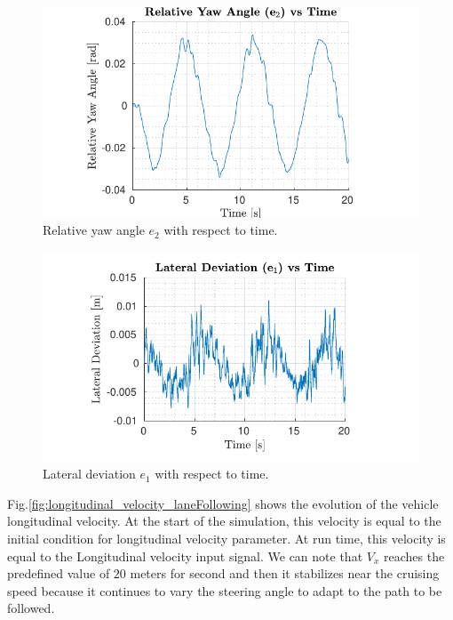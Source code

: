 \documentclass[conference, 11pt]{IEEEtran}
\begin{document}
\begin{figure}[!h]
	\centering
	\hspace*{-0.5in}
	\includegraphics[width=1.29\columnwidth]{../../MATLAB/lane_following/figure/RelativeYawAngleVsTime.pdf}
	\caption{Relative yaw angle $e_2$ with respect to time.}
	\label{fig:relative_yaw_angle_laneFollowing}
\end{figure}
\begin{figure}[!h]
	\centering
	\hspace*{-0.5in}
	\includegraphics[width=1.29\columnwidth]{../../MATLAB/lane_following/figure/LateralDeviationVsTime.pdf}
	\caption{Lateral deviation $e_1$ with respect to time.}
	\label{fig:lateral_deviation_laneFollowing}
\end{figure}
Fig.{\ref{fig:longitudinal_velocity_laneFollowing}} shows the evolution of the vehicle longitudinal velocity. At the start of the simulation, this velocity is equal to the initial condition for longitudinal velocity parameter. At run time, this velocity is equal to the Longitudinal velocity input signal. We can note that $V_x$ reaches the predefined value of $20$ meters for second and then it stabilizes near the cruising speed because it continues to vary the steering angle to adapt to the path to be followed.
\end{document}
